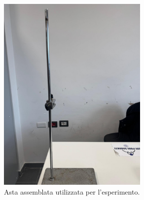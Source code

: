 \begin{figure}[H]
	\centering
	\includegraphics[width=0.65\textwidth]{./figures/asta}
	\caption{Asta assemblata utilizzata per l'esperimento.}
\end{figure}